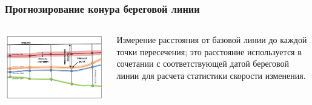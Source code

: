\documentclass[10pt]{beamer}
\begin{document}
\begin{frame}[fragile]
  \frametitle{Прогнозирование конура береговой линии}
  \begin{columns}
    \begin{column}{0.6\linewidth}
      \includegraphics[width=\linewidth]{dsas-model.png}
    \end{column}
    \begin{column}{0.4\linewidth}
      Измерение расстояния от базовой линии до каждой точки пересечения; это расстояние используется в сочетании с соответствующей датой береговой линии для расчета статистики скорости изменения.
    \end{column}
  \end{columns}
\end{frame}
\end{document}
